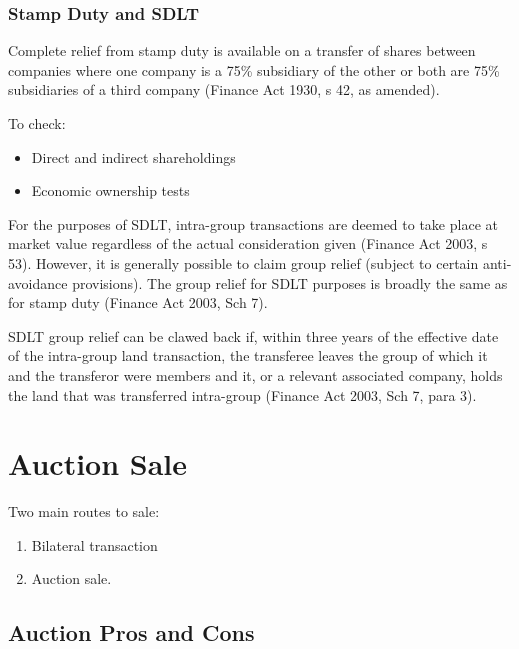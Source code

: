 \documentclass[
]{article}
\providecommand{\tightlist}{%
  \setlength{\itemsep}{0pt}\setlength{\parskip}{0pt}}
\begin{document}
\hypertarget{stamp-duty-and-sdlt}{%
\subsubsection{Stamp Duty and SDLT}\label{stamp-duty-and-sdlt}}

Complete relief from stamp duty is available on a transfer of shares
between companies where one company is a 75\% subsidiary of the other or
both are 75\% subsidiaries of a third company (Finance Act 1930, s 42,
as amended).

To check:

\begin{itemize}
\tightlist
\item
  Direct and indirect shareholdings
\item
  Economic ownership tests
\end{itemize}

For the purposes of SDLT, intra-group transactions are deemed to take
place at market value regardless of the actual consideration given
(Finance Act 2003, s 53). However, it is generally possible to claim
group relief (subject to certain anti-avoidance provisions). The group
relief for SDLT purposes is broadly the same as for stamp duty (Finance
Act 2003, Sch 7).

SDLT group relief can be clawed back if, within three years of the
effective date of the intra-group land transaction, the transferee
leaves the group of which it and the transferor were members and it, or
a relevant associated company, holds the land that was transferred
intra-group (Finance Act 2003, Sch 7, para 3).

\hypertarget{auction-sale}{%
\section{Auction Sale}\label{auction-sale}}

Two main routes to sale:

\begin{enumerate}
\tightlist
\item
  Bilateral transaction
\item
  Auction sale.
\end{enumerate}

\hypertarget{auction-pros-and-cons}{%
\subsection{Auction Pros and Cons}\label{auction-pros-and-cons}}
\end{document}
